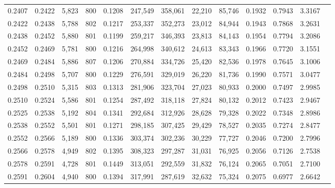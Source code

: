 \begin{tabular}{rrrrrrrrrrrrr}
0.2407 & 0.2422 &  5,823 & 800 &                                     0.1208 & 247,549 & 358,061 &  22,210 &  85,746 & 0.1932 & 0.7943 & 3.3167 \\
0.2422 & 0.2438 &  5,788 & 802 &                                     0.1217 & 253,337 & 352,273 &  23,012 &  84,944 & 0.1943 & 0.7868 & 3.2631 \\
0.2438 & 0.2452 &  5,880 & 801 &                                     0.1199 & 259,217 & 346,393 &  23,813 &  84,143 & 0.1954 & 0.7794 & 3.2086 \\
0.2452 & 0.2469 &  5,781 & 800 &                                     0.1216 & 264,998 & 340,612 &  24,613 &  83,343 & 0.1966 & 0.7720 & 3.1551 \\
0.2469 & 0.2484 &  5,886 & 807 &                                     0.1206 & 270,884 & 334,726 &  25,420 &  82,536 & 0.1978 & 0.7645 & 3.1006 \\
0.2484 & 0.2498 &  5,707 & 800 &                                     0.1229 & 276,591 & 329,019 &  26,220 &  81,736 & 0.1990 & 0.7571 & 3.0477 \\
0.2498 & 0.2510 &  5,315 & 803 &                                     0.1313 & 281,906 & 323,704 &  27,023 &  80,933 & 0.2000 & 0.7497 & 2.9985 \\
0.2510 & 0.2524 &  5,586 & 801 &                                     0.1254 & 287,492 & 318,118 &  27,824 &  80,132 & 0.2012 & 0.7423 & 2.9467 \\
0.2525 & 0.2538 &  5,192 & 804 &                                     0.1341 & 292,684 & 312,926 &  28,628 &  79,328 & 0.2022 & 0.7348 & 2.8986 \\
0.2538 & 0.2552 &  5,501 & 801 &                                     0.1271 & 298,185 & 307,425 &  29,429 &  78,527 & 0.2035 & 0.7274 & 2.8477 \\
0.2552 & 0.2566 &  5,189 & 800 &                                     0.1336 & 303,374 & 302,236 &  30,229 &  77,727 & 0.2046 & 0.7200 & 2.7996 \\
0.2566 & 0.2578 &  4,949 & 802 &                                     0.1395 & 308,323 & 297,287 &  31,031 &  76,925 & 0.2056 & 0.7126 & 2.7538 \\
0.2578 & 0.2591 &  4,728 & 801 &                                     0.1449 & 313,051 & 292,559 &  31,832 &  76,124 & 0.2065 & 0.7051 & 2.7100 \\
0.2591 & 0.2604 &  4,940 & 800 &                                     0.1394 & 317,991 & 287,619 &  32,632 &  75,324 & 0.2075 & 0.6977 & 2.6642 \\

\end{tabular}
